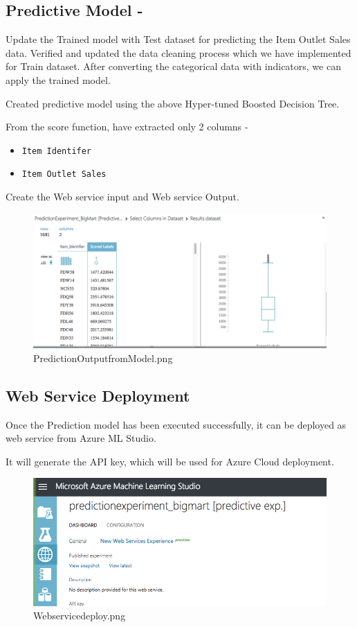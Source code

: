 \subsection{Predictive Model -}
Update the Trained model with Test dataset for predicting the Item Outlet 
Sales data. Verified and updated the data cleaning process which we have 
implemented for Train dataset. After converting the categorical data with 
indicators, we can apply the trained model.

Created predictive model using the above Hyper-tuned Boosted Decision Tree.

From the score function, have extracted only 2 columns -
\begin{itemize}
\item \verb|Item Identifer|
\item \verb|Item Outlet Sales|
\end{itemize}

Create the Web service input and Web service Output.

\begin{figure}[pic5]
	\centering\includegraphics[width=\columnwidth]{Images/mlstudio/PredictionOutputfromModel.png}
	\caption{PredictionOutputfromModel.png}\label{fig:PredictionOutputfromModel}
\end{figure}

\subsection{Web Service Deployment}
Once the Prediction model has been executed successfully, it can be deployed 
as web service from Azure ML Studio.

It will generate the API key, which will be used for Azure Cloud deployment.

\begin{figure}[pic6]
	\centering\includegraphics[width=\columnwidth]{Images/mlstudio/Webservicedeploy.png}
	\caption{Webservicedeploy.png}\label{fig:Webservicedeploy}
\end{figure}

